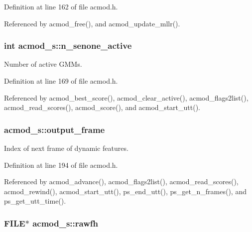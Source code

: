 Definition at line 162 of file acmod.\+h.



Referenced by acmod\+\_\+free(), and acmod\+\_\+update\+\_\+mllr().

\subsubsection[{n\+\_\+senone\+\_\+active}]{\setlength{\rightskip}{0pt plus 5cm}int acmod\+\_\+s\+::n\+\_\+senone\+\_\+active}\label{structacmod__s_a5081a507e3ca6de6c5695217245dc9f9}


Number of active G\+M\+Ms. 



Definition at line 169 of file acmod.\+h.



Referenced by acmod\+\_\+best\+\_\+score(), acmod\+\_\+clear\+\_\+active(), acmod\+\_\+flags2list(), acmod\+\_\+read\+\_\+scores(), acmod\+\_\+score(), and acmod\+\_\+start\+\_\+utt().

\subsubsection[{output\+\_\+frame}]{ acmod\+\_\+s\+::output\+\_\+frame}\label{structacmod__s_aec694af0767ac5e8f1022b6252111885}


Index of next frame of dynamic features. 



Definition at line 194 of file acmod.\+h.



Referenced by acmod\+\_\+advance(), acmod\+\_\+flags2list(), acmod\+\_\+read\+\_\+scores(), acmod\+\_\+rewind(), acmod\+\_\+start\+\_\+utt(), ps\+\_\+end\+\_\+utt(), ps\+\_\+get\+\_\+n\+\_\+frames(), and ps\+\_\+get\+\_\+utt\+\_\+time().

\subsubsection[{rawfh}]{\setlength{\rightskip}{0pt plus 5cm}F\+I\+L\+E$\ast$ acmod\+\_\+s\+::rawfh}\label{structacmod__s_aeac89442a04744ca607c4c66dab053e8}


